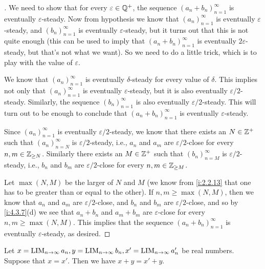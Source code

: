 \begin{proof}[]
  We need to show that for every \(\varepsilon \in \mathbb{Q}^+\), the sequence \((a_n + b_n)_{n = 1}^{\infty}\) is eventually \(\varepsilon\)-steady.
  Now from hypothesis we know that \((a_n)_{n = 1}^{\infty}\) is eventually \(\varepsilon\)-steady, and \((b_n)_{n = 1}^{\infty}\) is eventually \(\varepsilon\)-steady, but it turns out that this is not quite enough
  (this can be used to imply that \((a_n + b_n)_{n = 1}^{\infty}\) is eventually \(2\varepsilon\)-steady, but that's not what we want).
  So we need to do a little trick, which is to play with the value of \(\varepsilon\).

  We know that \((a_n)_{n = 1}^{\infty}\) is eventually \(\delta\)-steady for every value of \(\delta\).
  This implies not only that \((a_n)_{n = 1}^{\infty}\) is eventually \(\varepsilon\)-steady, but it is also eventually \(\varepsilon / 2\)-steady.
  Similarly, the sequence \((b_n)_{n = 1}^{\infty}\) is also eventually \(\varepsilon / 2\)-steady.
  This will turn out to be enough to conclude that \((a_n + b_n)_{n = 1}^{\infty}\) is eventually \(\varepsilon\)-steady.

  Since \((a_n)_{n = 1}^{\infty}\) is eventually \(\varepsilon / 2\)-steady, we know that there exists an \(N \in \mathbb{Z}^+\) such that \((a_n)_{n = N}^{\infty}\) is \(\varepsilon / 2\)-steady, i.e., \(a_n\) and \(a_m\) are \(\varepsilon / 2\)-close for every \(n, m \in \mathbb{Z}_{\geq N}\).
  Similarly there exists an \(M \in \mathbb{Z}^+\) such that \((b_n)_{n = M}^{\infty}\) is \(\varepsilon / 2\)-steady, i.e., \(b_n\) and \(b_m\) are \(\varepsilon / 2\)-close for every \(n, m \in \mathbb{Z}_{\geq M}\).

  Let \(\max(N, M)\) be the larger of \(N\) and \(M\)
  (we know from \cref{i:2.2.13} that one has to be greater than or equal to the other).
  If \(n, m \geq \max(N, M)\), then we know that \(a_n\) and \(a_m\) are \(\varepsilon / 2\)-close, and \(b_n\) and \(b_m\) are \(\varepsilon / 2\)-close, and so by \cref{i:4.3.7}(d) we see that \(a_n + b_n\) and \(a_m + b_m\) are \(\varepsilon\)-close for every \(n, m \geq \max(N, M)\).
  This implies that the sequence \((a_n + b_n)_{n = 1}^{\infty}\) is eventually \(\varepsilon\)-steady, as desired.
\end{proof}

\begin{lem}\label{i:5.3.7}
  Let \(x = \operatorname*{LIM}_{n \to \infty} a_n, y = \operatorname*{LIM}_{n \to \infty} b_n, x' = \operatorname*{LIM}_{n \to \infty} a_n'\) be real numbers.
  Suppose that \(x = x'\).
  Then we have \(x + y = x' + y\).
\end{lem}


